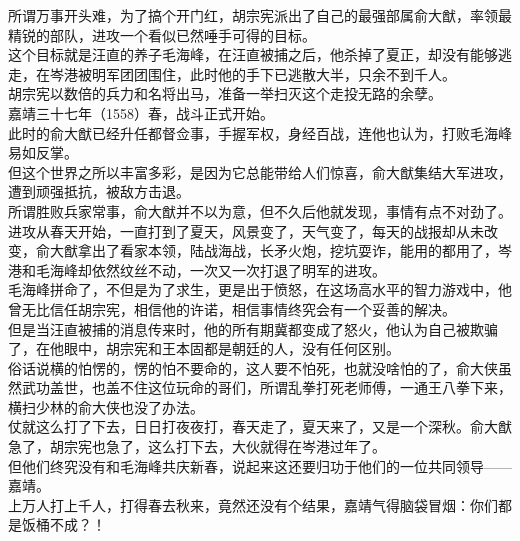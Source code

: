 \begin{multicols}{\theparacolNo}
所谓万事开头难，为了搞个开门红，胡宗宪派出了自己的最强部属俞大猷，率领最精锐的部队，进攻一个看似已然唾手可得的目标。\\

这个目标就是汪直的养子毛海峰，在汪直被捕之后，他杀掉了夏正，却没有能够逃走，在岑港被明军团团围住，此时他的手下已逃散大半，只余不到千人。\\

胡宗宪以数倍的兵力和名将出马，准备一举扫灭这个走投无路的余孽。\\

嘉靖三十七年（1558）春，战斗正式开始。\\

此时的俞大猷已经升任都督佥事，手握军权，身经百战，连他也认为，打败毛海峰易如反掌。\\

但这个世界之所以丰富多彩，是因为它总能带给人们惊喜，俞大猷集结大军进攻，遭到顽强抵抗，被敌方击退。\\

所谓胜败兵家常事，俞大猷并不以为意，但不久后他就发现，事情有点不对劲了。\\

进攻从春天开始，一直打到了夏天，风景变了，天气变了，每天的战报却从未改变，俞大猷拿出了看家本领，陆战海战，长矛火炮，挖坑耍诈，能用的都用了，岑港和毛海峰却依然纹丝不动，一次又一次打退了明军的进攻。\\

毛海峰拼命了，不但是为了求生，更是出于愤怒，在这场高水平的智力游戏中，他曾无比信任胡宗宪，相信他的许诺，相信事情终究会有一个妥善的解决。\\

但是当汪直被捕的消息传来时，他的所有期冀都变成了怒火，他认为自己被欺骗了，在他眼中，胡宗宪和王本固都是朝廷的人，没有任何区别。\\

俗话说横的怕愣的，愣的怕不要命的，这人要不怕死，也就没啥怕的了，俞大侠虽然武功盖世，也盖不住这位玩命的哥们，所谓乱拳打死老师傅，一通王八拳下来，横扫少林的俞大侠也没了办法。\\

仗就这么打了下去，日日打夜夜打，春天走了，夏天来了，又是一个深秋。俞大猷急了，胡宗宪也急了，这么打下去，大伙就得在岑港过年了。\\

但他们终究没有和毛海峰共庆新春，说起来这还要归功于他们的一位共同领导——嘉靖。\\

上万人打上千人，打得春去秋来，竟然还没有个结果，嘉靖气得脑袋冒烟：你们都是饭桶不成？！\\


\end{multicols}
